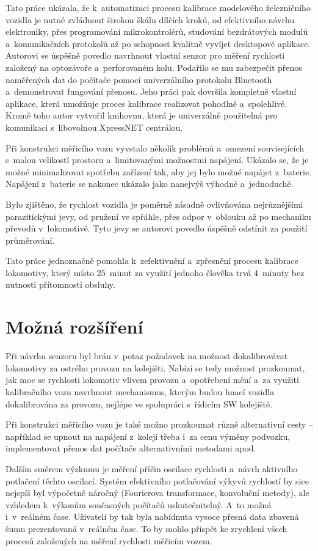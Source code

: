 Tato práce ukázala, že k~automatizaci procesu kalibrace modelového železničního
vozidla je nutné zvládnout širokou škálu dílčích kroků, od efektivního návrhu
elektroniky, přes programování mikrokontrolérů, studování bezdrátových modulů
a~komunikačních protokolů až po schopnost kvalitně vyvíjet desktopové aplikace.
Autorovi se úspěšně povedlo navrhnout vlastní senzor pro měření rychlosti
založený na optozávoře a~perforovaném kolu. Podařilo se mu zabezpečit přenos
naměřených dat do počítače pomocí univerzálního protokolu Bluetooth
a~demonstrovat fungování přenosu. Jeho práci pak dovršila kompletně vlastní
aplikace, která umožňuje proces kalibrace realizovat pohodlně a~spolehlivě.
Kromě toho autor vytvořil knihovnu, která je univerzálně použitelná pro
komunikaci s~libovolnou XpressNET centrálou.

Při konstrukci měřicího vozu vyvstalo několik problémů a~omezení souvisejících
s~malou velikostí prostoru a~limitovanými možnostmi napájení. Ukázalo se, že je
možné minimalizovat spotřebu zařízení tak, aby jej bylo možné napájet
z~baterie.  Napájení z~baterie se nakonec ukázalo jako nanejvýš výhodné
a~jednoduché.

Bylo zjištěno, že rychlost vozidla je poměrně zásadně ovlivňována nejrůznějšími
parazitickými jevy, od pružení ve spřáhle, přes odpor v~oblouku až po mechaniku
převodů v~lokomotivě. Tyto jevy se autorovi povedlo úspěšně odstínit za použití
průměrování.

Tato práce jednoznačně pomohla k~zefektivnění a~zpřesnění procesu kalibrace
lokomotivy, který místo 25~minut za využití jednoho člověka trvá 4~minuty
bez nutnosti přítomnosti obsluhy.

\section{Možná rozšíření}

Při návrhu senzoru byl brán v~potaz požadavek na možnost dokalibrovávat
lokomotivy za ostrého provozu na kolejišti. Nabízí se tedy možnost prozkoumat,
jak moc se rychlosti lokomotiv vlivem provozu a~opotřebení mění a~za využití
kalibračního vozu navrhnout mechanismus, kterým budou hnací vozidla
dokalibrována za provozu, nejlépe ve spolupráci s~řídicím SW kolejiště.

Při konstrukci měřicího vozu je také možno prozkoumat různé alternativní
cesty -- například se upnout na napájení z~kolejí třeba i~za cenu výměny
podvozku, implementovat přenos dat počítače alternativními metodami apod.

Dalším směrem výzkumu je měření příčin oscilace rychlosti a~návrh
aktivního potlačení těchto oscilací. Systém efektivního potlačování výkyvů
rychlostí by sice nejspíš byl výpočetně náročný (Fourierova transformace,
konvoluční metody), ale vzhledem k~výkonům současných počítačů uskutečnitelný.
A~to možná i~v~reálném čase. Uživateli by tak byla nabídnuta vysoce přesná data
zbavená šumu prezentovaná v~reálném čase. To by mohlo přispět ke zrychlení
všech procesů založených na měření rychlosti měřicím vozem.
